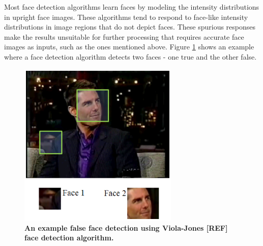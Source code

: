 \documentclass[times, 10pt,twocolumn]{article}
\begin{document}
Most face detection algorithms learn faces by modeling the
intensity distributions in upright face images. These algorithms
tend to respond to face-like intensity
distributions in image regions that do not depict faces.
These spurious responses make the results unsuitable for further processing
that requires accurate face images as inputs, such as the ones
mentioned above. Figure \ref{Fig:ExampleFalseDetect} shows an
example where a face detection algorithm detects two faces - one
true and the other false.
\begin{figure}[h]
\centering
\includegraphics[width=3in]{Figure1.eps}
\caption{{\bf {\selectfont An example false face
detection using Viola-Jones [REF] face detection algorithm.}}}
\label{Fig:ExampleFalseDetect}
\end{figure}
\end{document}
